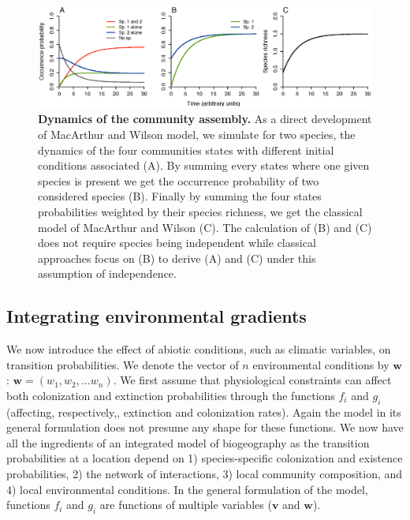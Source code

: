 \begin{figure}[h!]
\centering
\includegraphics[width=\textwidth]{./chapitre1/fig1.eps}
\caption{\textbf{Dynamics of the community assembly.} As a direct development of MacArthur and Wilson model, we simulate for two species, the dynamics of the four communities states with different initial conditions associated (A). By summing every states where one given species is present we get the occurrence probability of two considered species (B). Finally by summing the four states probabilities weighted by their species richness, we get the classical model of MacArthur and Wilson (C). The calculation of (B) and (C) does not require species being independent while classical approaches focus on (B) to derive (A) and (C) under this assumption of independence.}
\label{chap1fig1}
\end{figure}



\subsection{Integrating environmental gradients}

We now introduce the effect of abiotic conditions, such as climatic variables, on transition probabilities. We denote the vector of $n$ environmental conditions by $\mathbf{w}$: $\mathbf{w}=(w_1,w_2,...w_n)$. We first assume that physiological constraints can affect both colonization and extinction probabilities through the functions $f_i$ and $g_i$ (affecting, respectively,, extinction and colonization rates). Again the model in its general formulation does not presume any shape for these functions. We now have all the ingredients of an integrated model of biogeography as the transition probabilities at a location depend on 1) species-specific colonization and existence probabilities, 2) the network of interactions, 3) local community composition, and 4) local environmental conditions. In the general formulation of the model, functions $f_i$ and $g_i$ are functions of multiple variables ($\mathbf{v}$ and $\mathbf{w}$).

